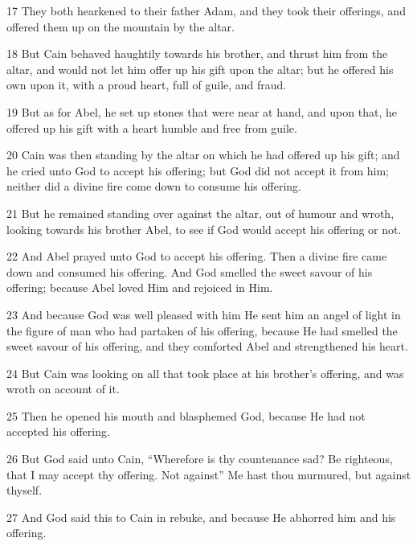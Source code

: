 \par 17 They both hearkened to their father Adam, and they took their offerings, and offered them up on the mountain by the altar.

\par 18 But Cain behaved haughtily towards his brother, and thrust him from the altar, and would not let him offer up his gift upon the altar; but he offered his own upon it, with a proud heart, full of guile, and fraud.

\par 19 But as for Abel, he set up stones that were near at hand, and upon that, he offered up his gift with a heart humble and free from guile.

\par 20 Cain was then standing by the altar on which he had offered up his gift; and he cried unto God to accept his offering; but God did not accept it from him; neither did a divine fire come down to consume his offering.

\par 21 But he remained standing over against the altar, out of humour and wroth, looking towards his brother Abel, to see if God would accept his offering or not.

\par 22 And Abel prayed unto God to accept his offering. Then a divine fire came down and consumed his offering. And God smelled the sweet savour of his offering; because Abel loved Him and rejoiced in Him.

\par 23 And because God was well pleased with him He sent him an angel of light in the figure of man who had partaken of his offering, because He had smelled the sweet savour of his offering, and they comforted Abel and strengthened his heart.

\par 24 But Cain was looking on all that took place at his brother's offering, and was wroth on account of it.

\par 25 Then he opened his mouth and blasphemed God, because He had not accepted his offering.

\par 26 But God said unto Cain, “Wherefore is thy countenance sad? Be righteous, that I may accept thy offering. Not against” Me hast thou murmured, but against thyself.

\par 27 And God said this to Cain in rebuke, and because He abhorred him and his offering.

